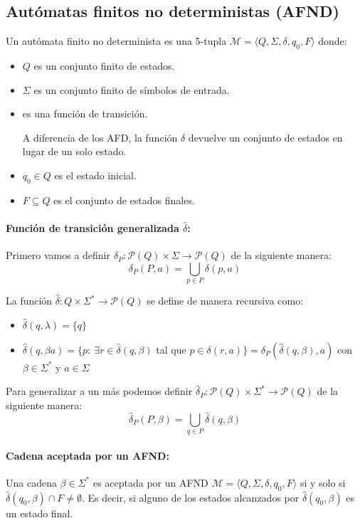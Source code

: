 \subsection{Autómatas finitos no deterministas (AFND)}
Un autómata finito no determinista es una 5-tupla \(\mathcal{M}=\langle Q,\Sigma,\delta,q_0,F\rangle\) donde:
\begin{itemize}
  \item \(Q\) es un conjunto finito de estados.
  \item \(\Sigma\) es un conjunto finito de símbolos de entrada.
  \item {} es una función de transición.

        A diferencia de los AFD, la función \(\delta\) devuelve un conjunto de estados en lugar de un solo estado.
  \item \(q_0\in Q\) es el estado inicial.
  \item \(F\subseteq Q\) es el conjunto de estados finales.
\end{itemize}

\paragraph{Función de transición generalizada \(\hat{\delta}\):} Primero vamos a definir \(\delta_P : \mathcal{P}(Q)\times\Sigma\to\mathcal{P}(Q)\) de la siguiente manera:
\[ \delta_P(P,a) = \underset{p\in P}{\bigcup}\delta(p,a)\]

La función \(\hat{\delta} : Q\times\Sigma^*\to \mathcal{P}(Q)\) se define de manera recursiva como:
\begin{itemize}
  \item \(\hat{\delta}(q,\lambda)=\{q\}\)
  \item \(\hat{\delta}(q,\beta a)= \{ p:~\exists r\in\hat{\delta}(q,\beta)\) tal que \(p \in \delta(r, a)\} = \delta_P(\hat{\delta}(q, \beta), a)\) con \(\beta\in\Sigma^*\) y \(a\in\Sigma\)
\end{itemize}

Para generalizar a un más podemos definir \(\hat{\delta}_P : \mathcal{P}(Q)\times\Sigma^*\to\mathcal{P}(Q)\) de la siguiente manera:
\[ \hat{\delta}_P(P,\beta) = \underset{q\in P}{\bigcup}\hat{\delta}(q,\beta)\]

\paragraph{Cadena aceptada por un AFND:} Una cadena \(\beta\in\Sigma^*\) es aceptada por un AFND \(\mathcal{M} = \langle Q, \Sigma, \delta, q_0, F\rangle\) si y solo si \(\hat{\delta}(q_0,\beta)\cap F \neq \emptyset\). Es decir, si alguno de los estados alcanzados por \(\hat{\delta}(q_0,\beta)\) es un estado final.

